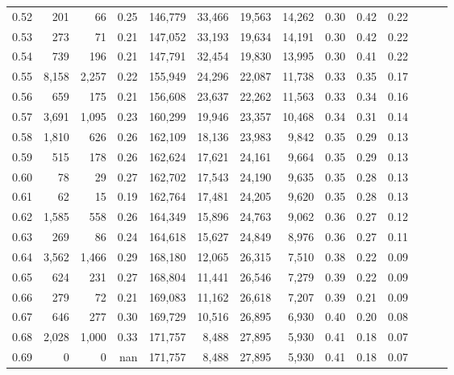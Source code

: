 \begin{tabular}{rrrrrrrrrrrrrr}
0.52 &     201 &     66 &  0.25 &  146,779 &   33,466 &  19,563 &  14,262 &  0.30 &  0.42 &      0.22 \\
0.53 &     273 &     71 &  0.21 &  147,052 &   33,193 &  19,634 &  14,191 &  0.30 &  0.42 &      0.22 \\
0.54 &     739 &    196 &  0.21 &  147,791 &   32,454 &  19,830 &  13,995 &  0.30 &  0.41 &      0.22 \\
0.55 &   8,158 &  2,257 &  0.22 &  155,949 &   24,296 &  22,087 &  11,738 &  0.33 &  0.35 &      0.17 \\
0.56 &     659 &    175 &  0.21 &  156,608 &   23,637 &  22,262 &  11,563 &  0.33 &  0.34 &      0.16 \\
0.57 &   3,691 &  1,095 &  0.23 &  160,299 &   19,946 &  23,357 &  10,468 &  0.34 &  0.31 &      0.14 \\
0.58 &   1,810 &    626 &  0.26 &  162,109 &   18,136 &  23,983 &   9,842 &  0.35 &  0.29 &      0.13 \\
0.59 &     515 &    178 &  0.26 &  162,624 &   17,621 &  24,161 &   9,664 &  0.35 &  0.29 &      0.13 \\
0.60 &      78 &     29 &  0.27 &  162,702 &   17,543 &  24,190 &   9,635 &  0.35 &  0.28 &      0.13 \\
0.61 &      62 &     15 &  0.19 &  162,764 &   17,481 &  24,205 &   9,620 &  0.35 &  0.28 &      0.13 \\
0.62 &   1,585 &    558 &  0.26 &  164,349 &   15,896 &  24,763 &   9,062 &  0.36 &  0.27 &      0.12 \\
0.63 &     269 &     86 &  0.24 &  164,618 &   15,627 &  24,849 &   8,976 &  0.36 &  0.27 &      0.11 \\
0.64 &   3,562 &  1,466 &  0.29 &  168,180 &   12,065 &  26,315 &   7,510 &  0.38 &  0.22 &      0.09 \\
0.65 &     624 &    231 &  0.27 &  168,804 &   11,441 &  26,546 &   7,279 &  0.39 &  0.22 &      0.09 \\
0.66 &     279 &     72 &  0.21 &  169,083 &   11,162 &  26,618 &   7,207 &  0.39 &  0.21 &      0.09 \\
0.67 &     646 &    277 &  0.30 &  169,729 &   10,516 &  26,895 &   6,930 &  0.40 &  0.20 &      0.08 \\
0.68 &   2,028 &  1,000 &  0.33 &  171,757 &    8,488 &  27,895 &   5,930 &  0.41 &  0.18 &      0.07 \\
0.69 &       0 &      0 &   nan &  171,757 &    8,488 &  27,895 &   5,930 &  0.41 &  0.18 &      0.07 \\

\end{tabular}
